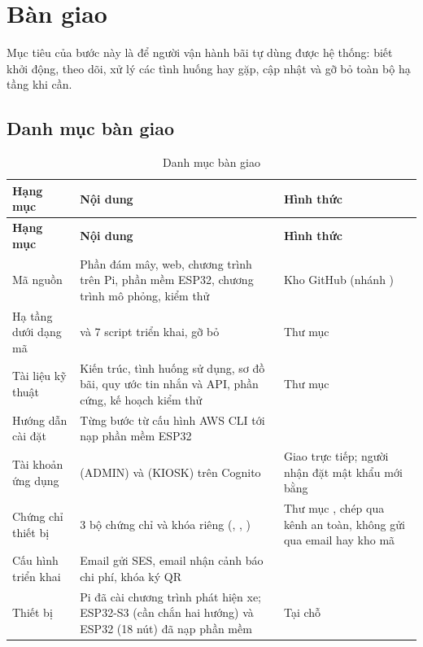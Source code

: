 \chapter{Bàn giao}

Mục tiêu của bước này là để người vận hành bãi tự dùng được hệ thống: biết khởi động, theo dõi, xử lý các tình huống hay gặp, cập nhật và gỡ bỏ toàn bộ hạ tầng khi cần.

\section{Danh mục bàn giao}\label{sec:danhmuc}

\begin{longtable}{@{}P{3.6cm}P{7.2cm}P{3.3cm}@{}}
\caption{Danh mục bàn giao}\label{tab:bangiao}\\
\toprule
\textbf{Hạng mục} & \textbf{Nội dung} & \textbf{Hình thức} \\ \midrule
\endfirsthead
\toprule
\textbf{Hạng mục} & \textbf{Nội dung} & \textbf{Hình thức} \\ \midrule
\endhead
Mã nguồn & Phần đám mây, web, chương trình trên Pi, phần mềm ESP32, chương trình mô phỏng, kiểm thử & Kho GitHub (nhánh ) \\
Hạ tầng dưới dạng mã &  và 7 script triển khai, gỡ bỏ & Thư mục  \\
Tài liệu kỹ thuật & Kiến trúc, tình huống sử dụng, sơ đồ bãi, quy ước tin nhắn và API, phần cứng, kế hoạch kiểm thử & Thư mục  \\
Hướng dẫn cài đặt & Từng bước từ cấu hình AWS CLI tới nạp phần mềm ESP32 &  \\
Tài khoản ứng dụng &  (ADMIN) và  (KIOSK) trên Cognito & Giao trực tiếp; người nhận đặt mật khẩu mới bằng  \\
Chứng chỉ thiết bị & 3 bộ chứng chỉ và khóa riêng (, , ) & Thư mục , chép qua kênh an toàn, không gửi qua email hay kho mã \\
Cấu hình triển khai & Email gửi SES, email nhận cảnh báo chi phí, khóa ký QR &  \\
Thiết bị & Pi đã cài chương trình phát hiện xe; ESP32-S3 (cần chắn hai hướng) và ESP32 (18 nút) đã nạp phần mềm & Tại chỗ \\
\bottomrule
\end{longtable}

